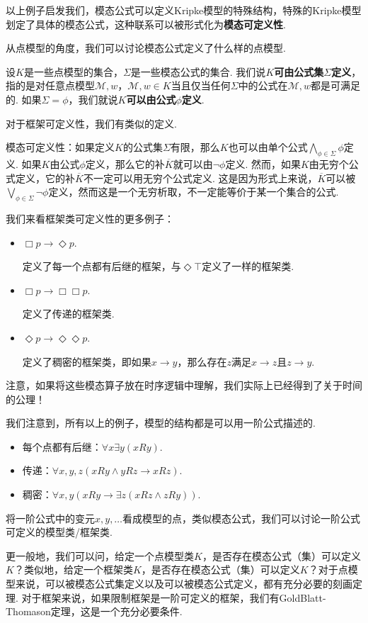 以上例子启发我们，模态公式可以定义Kripke模型的特殊结构，特殊的Kripke模型划定了具体的模态公式，这种联系可以被形式化为\textbf{模态可定义性}.

从点模型的角度，我们可以讨论模态公式定义了什么样的点模型. 

\begin{definition}[点模型可定义性]
设$K$是一些点模型的集合，$\Sigma$是一些模态公式的集合. 我们说\textbf{$K$可由公式集$\Sigma$定义}，指的是对任意点模型$\mathcal M,w$，$\mathcal M,w\in K$当且仅当任何$\Sigma$中的公式在$\mathcal M,w$都是可满足的. 如果$\Sigma={\phi}$，我们就说\textbf{$K$可以由公式$\phi$定义}. 
\end{definition}
对于框架可定义性，我们有类似的定义.

模态可定义性：如果定义$K$的公式集$\Sigma$有限，那么$K$也可以由单个公式$\bigwedge_{\phi\in\Sigma}\phi$定义. 如果$K$由公式$\phi$定义，那么它的补$\overline{K}$就可以由$\neg\phi$定义. 然而，如果$K$由无穷个公式定义，它的补$\overline{K}$不一定可以用无穷个公式定义. 这是因为形式上来说，$\overline{K}$可以被$\bigvee_{\phi\in\Sigma}\neg\phi$定义，然而这是一个无穷析取，不一定能等价于某一个集合的公式.

我们来看框架类可定义性的更多例子：
\begin{example}
\begin{itemize}
    \item $\Box p\to\Diamond p$.
 
    定义了每一个点都有后继的框架，与$\Diamond\top$定义了一样的框架类.
    
    \item $\Box p\to\Box\Box p$.
    
    定义了传递的框架类.
    
    \item $\Diamond p\to\Diamond \Diamond p$.
    
    定义了稠密的框架类，即如果$x\to y$，那么存在$z$满足$x\to z$且$z\to y$.
\end{itemize}
注意，如果将这些模态算子放在时序逻辑中理解，我们实际上已经得到了关于时间的公理！%
\end{example}

\begin{remark}
我们注意到，所有以上的例子，模型的结构都是可以用一阶公式描述的.
\begin{itemize}
    \item 每个点都有后继：$\forall x\exists y(xRy)$.
    \item 传递：$\forall x,y,z(xRy\wedge yRz\to xRz)$.
    \item 稠密：$\forall x,y(xRy\to\exists z(xRz\wedge zRy))$.
\end{itemize}
 将一阶公式中的变元$x,y,\dots$看成模型的点，类似模态公式，我们可以讨论一阶公式可定义的模型类/框架类. 
 
 更一般地，我们可以问，给定一个点模型类$K$，是否存在模态公式（集）可以定义$K$？类似地，给定一个框架类$K$，是否存在模态公式（集）可以定义$K$？对于点模型来说，可以被模态公式集定义以及可以被模态公式定义，都有充分必要的刻画定理. 对于框架来说，如果限制框架是一阶可定义的框架，我们有GoldBlatt-Thomason定理，这是一个充分必要条件.
\end{remark}

